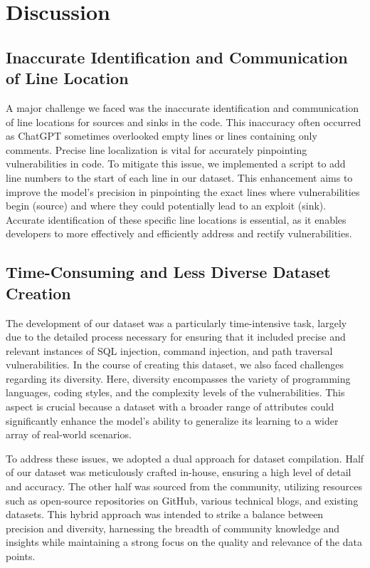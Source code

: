 \documentclass[acmsmall]{acmart}
\begin{document}
\section{Discussion}

\subsection{Inaccurate Identification and Communication of Line Location}
A major challenge we faced was the inaccurate identification and communication of line locations for sources and sinks in the code. This inaccuracy often occurred as ChatGPT sometimes overlooked empty lines or lines containing only comments. Precise line localization is vital for accurately pinpointing vulnerabilities in code. To mitigate this issue, we implemented a script to add line numbers to the start of each line in our dataset. This enhancement aims to improve the model's precision in pinpointing the exact lines where vulnerabilities begin (source) and where they could potentially lead to an exploit (sink). Accurate identification of these specific line locations is essential, as it enables developers to more effectively and efficiently address and rectify vulnerabilities.

\subsection{Time-Consuming and Less Diverse Dataset Creation}
The development of our dataset was a particularly time-intensive task, largely due to the detailed process necessary for ensuring that it included precise and relevant instances of SQL injection, command injection, and path traversal vulnerabilities. In the course of creating this dataset, we also faced challenges regarding its diversity. Here, diversity encompasses the variety of programming languages, coding styles, and the complexity levels of the vulnerabilities. This aspect is crucial because a dataset with a broader range of attributes could significantly enhance the model's ability to generalize its learning to a wider array of real-world scenarios.

To address these issues, we adopted a dual approach for dataset compilation. Half of our dataset was meticulously crafted in-house, ensuring a high level of detail and accuracy. The other half was sourced from the community, utilizing resources such as open-source repositories on GitHub, various technical blogs, and existing datasets. This hybrid approach was intended to strike a balance between precision and diversity, harnessing the breadth of community knowledge and insights while maintaining a strong focus on the quality and relevance of the data points.
\end{document}
